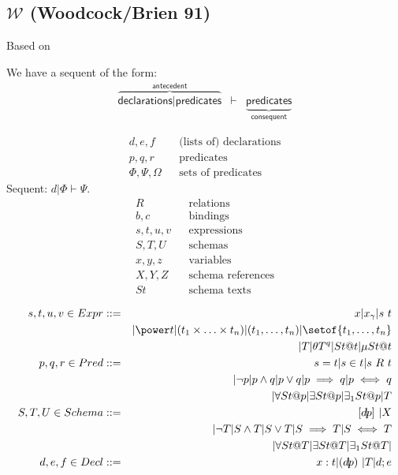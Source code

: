 \subsection{$\mathcal{W}$ (Woodcock/Brien 91)}
Based on \cite{WB91}

\def\bindof#1{\langle\!|#1|\!\rangle}
\def\bto{\rightsquigarrow}

We have a sequent of the form:
\begin{eqnarray*} 
  \overbrace{\textsf{declarations} | \textsf{predicates}}^{\textsf{antecedent}}
 &\vdash&
 \underbrace{\textsf{predicates}}_{\textsf{consequent}}
\end{eqnarray*}

\begin{eqnarray*}
   d,e,f && \mbox{(lists of) declarations}
\\ p,q,r && \mbox{predicates}
\\ \Phi, \Psi, \Omega && \mbox{sets of predicates}
\end{eqnarray*}
Sequent: $d | \Phi \vdash \Psi$.
\begin{eqnarray*}
   R && \textrm{relations}
\\ b,c && \textrm{bindings}
\\ s,t,u,v && \textrm{expressions}
\\ S,T,U && \textrm{schemas}
\\ x,y,z && \textrm{variables}
\\ X, Y, Z && \textrm{schema references}
\\ St && \textrm{schema texts}
\end{eqnarray*}

\begin{eqnarray*}
   s,t,u,v \in Expr 
     &::=& x | x_\gamma | s~t 
\\ && {} | \power t | (t_1 \times \ldots \times t_n)|(t_1,\ldots ,t_n)| \setof{t_1, \ldots, t_n}
\\ && {} | T | \theta T^q | St @ t | \mu St @ t
\\ p,q,r \in Pred 
     &::=& s=t | s \in t | s~R~t
\\ && {} | \lnot p | p \land q | p \lor q | p \implies q | p \iff q
\\ && {} | \forall St @ p | \exists St @ p | \exists_1 St @ p | T
\\ S,T,U \in Schema 
     &::=& [d\!|\!p]~ | X
\\ && {} | \lnot T |  S \land T | S \lor T | S \implies T | S \iff T
\\ && {} | \forall St @ T | \exists St @ T | \exists_1 St @ T | 
\\ d,e,f \in Decl
     &::=& x:t |  (d\!|\!p)~ | T |  d;e 
\end{eqnarray*}

